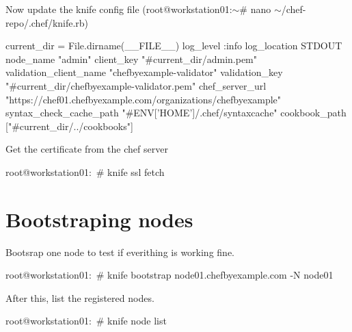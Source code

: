 Now update the knife config file (root@workstation01:\ensuremath{\sim}\# nano \ensuremath{\sim}/chef-repo/.chef/knife.rb)

\begin{codelisting}
\label{code:}
\codecaption{}
\begin{code}

current_dir = File.dirname(__FILE__)
log_level                :info
log_location             STDOUT
node_name                "admin"
client_key               "#{current_dir}/admin.pem"
validation_client_name   "chefbyexample-validator"
validation_key           "#{current_dir}/chefbyexample-validator.pem"
chef_server_url          "https://chef01.chefbyexample.com/organizations/chefbyexample"
syntax_check_cache_path  "#{ENV['HOME']}/.chef/syntaxcache"
cookbook_path            ["#{current_dir}/../cookbooks"]

\end{code}
\end{codelisting}

Get the certificate from the chef server

\begin{codelisting}
\label{code:}
\codecaption{}
\begin{code}

root@workstation01:~# knife ssl fetch

\end{code}
\end{codelisting}

\section{Bootstraping nodes}

Bootsrap one node to test if everithing is working fine.

\begin{codelisting}
\label{code:}
\codecaption{}
\begin{code}

root@workstation01:~# knife bootstrap node01.chefbyexample.com -N node01

\end{code}
\end{codelisting}

After this, list the registered nodes.

\begin{codelisting}
\label{code:}
\codecaption{}
\begin{code}

root@workstation01:~# knife node list

\end{code}
\end{codelisting}

